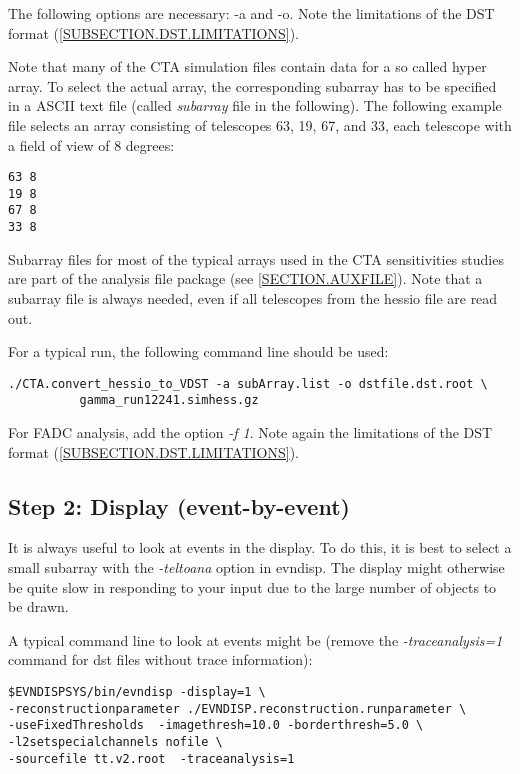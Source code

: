 \documentclass[titlepage,a4paper,twoside,11pt]{report}
\begin{document}
The following options are necessary: -a and -o.
Note the limitations of the DST format (\ref{SUBSECTION.DST.LIMITATIONS}).

Note that many of the CTA simulation files contain data for a so called hyper array. 
To select the actual array, the corresponding subarray has to be specified in a ASCII text file (called {\it subarray} file in the following).
The following example file selects an array consisting of telescopes 63, 19, 67, and 33, each telescope
with a field of view of 8 degrees:

\begin{lstlisting}
63 8
19 8
67 8
33 8
\end{lstlisting}

Subarray files for most of the typical arrays used in the CTA sensitivities studies are part of the analysis file package 
(see \ref{SECTION.AUXFILE}). Note that a subarray file is always needed, even if all telescopes from the hessio file are read out.

For a typical run, the following command line should be used:

\begin{lstlisting}
./CTA.convert_hessio_to_VDST -a subArray.list -o dstfile.dst.root \ 
          gamma_run12241.simhess.gz  
\end{lstlisting}

For FADC analysis, add the option {\it -f 1}. Note again the limitations of the DST format (\ref{SUBSECTION.DST.LIMITATIONS}).


\subsection{Step 2: Display (event-by-event)}

It is always useful to look at events in the display. 
To do this, it is best to select a small subarray with the {\it -teltoana} option in evndisp.
The display might otherwise be quite slow in responding to your input due to the large number of objects to be drawn.

A typical command line to look at events might be (remove the {\it -traceanalysis=1} command for dst files without trace information):

\begin{lstlisting}
$EVNDISPSYS/bin/evndisp -display=1 \
-reconstructionparameter ./EVNDISP.reconstruction.runparameter \
-useFixedThresholds  -imagethresh=10.0 -borderthresh=5.0 \
-l2setspecialchannels nofile \
-sourcefile tt.v2.root  -traceanalysis=1
\end{lstlisting}
\end{document}
